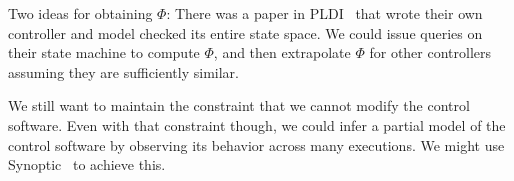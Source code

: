 Two ideas for obtaining $\Phi$:
 There was a paper in PLDI~\cite{vericon} that
wrote their own controller and model checked its entire state space. We could issue queries on their
state machine to compute $\Phi$, and then extrapolate $\Phi$ for other controllers assuming they are sufficiently similar.

 We still want to maintain the constraint that we cannot modify the control software.
Even with that constraint though, we could infer a partial model of the control software by observing its behavior across many executions.
We might use Synoptic~\cite{beschastnikh2011leveraging} to achieve this.
